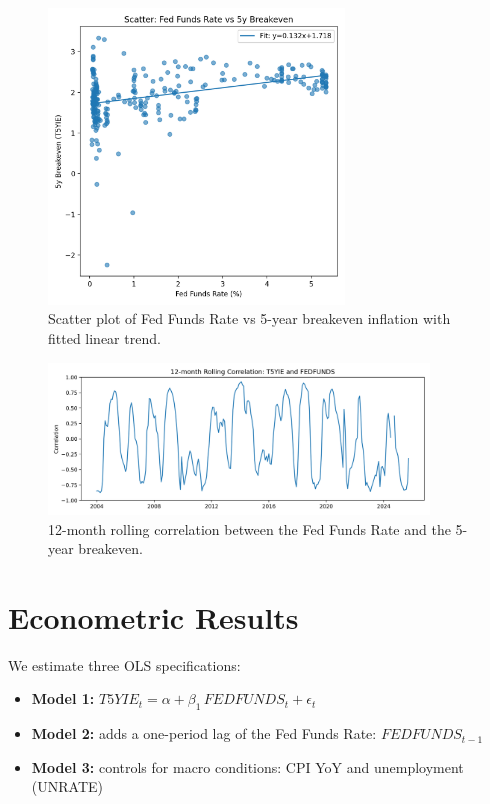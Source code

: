 \documentclass[11pt]{article}
\begin{document}
\begin{figure}[H]
  \centering
  \includegraphics[width=0.7\textwidth]{images/fig2_scatter.png}
  \caption{Scatter plot of Fed Funds Rate vs 5-year breakeven inflation with fitted linear trend.}
\end{figure}

\begin{figure}[H]
  \centering
  \includegraphics[width=0.9\textwidth]{images/fig3_rollingcorr.png}
  \caption{12-month rolling correlation between the Fed Funds Rate and the 5-year breakeven.}
\end{figure}

\section{Econometric Results}
We estimate three OLS specifications:

\begin{itemize}
  \item \textbf{Model 1:} $T5YIE_t = \alpha + \beta_1\, FEDFUNDS_t + \epsilon_t$
  \item \textbf{Model 2:} adds a one-period lag of the Fed Funds Rate: $FEDFUNDS_{t-1}$
  \item \textbf{Model 3:} controls for macro conditions: CPI YoY and unemployment (UNRATE)
\end{itemize}
\end{document}
